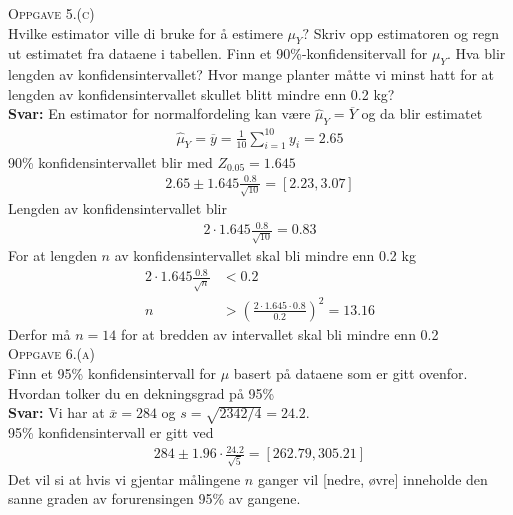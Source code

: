 \documentclass{article}
\begin{document}
\textsc{Oppgave 5.(c)}\\
Hvilke estimator ville di bruke for å estimere $\mu_Y?$ Skriv opp estimatoren og
regn ut estimatet fra dataene i tabellen. Finn et 90\%-konfidensitervall for
$\mu_Y.$ Hva blir lengden av konfidensintervallet? Hvor mange planter måtte vi
minst hatt for at lengden av konfidensintervallet skullet blitt mindre enn 0.2
kg?\\
\textbf{Svar:} En estimator for normalfordeling kan være
$\hat{\mu}_Y=\overline{Y}$ og da blir estimatet
\begin{align*}
  \hat{\mu}_Y=\overline{y}=\frac{1}{10}\sum_{i=1}^{10}y_i=2.65
\end{align*}
90\% konfidensintervallet blir med $Z_{0.05}=1.645$
\begin{align*}
  2.65\pm 1.645 \frac{0.8}{\sqrt{10}}=[2.23, 3.07]
\end{align*}
Lengden av konfidensintervallet blir
\begin{align*}
  2\cdot 1.645 \frac{0.8}{\sqrt{10}}=0.83
\end{align*}
For at lengden $n$ av konfidensintervallet skal bli mindre enn 0.2 kg
\begin{align*}
  2\cdot 1.645\frac{0.8}{\sqrt{n}} &< 0.2\\
                                 n &> \left( \frac{2\cdot 1.645\cdot 0.8}{0.2} \right)^2=13.16
\end{align*}
Derfor må $n=14$ for at bredden av intervallet skal bli mindre enn 0.2\\

\textsc{Oppgave 6.(a)}\\
Finn et 95\% konfidensintervall for $\mu$ basert på dataene som er gitt ovenfor.
Hvordan tolker du en dekningsgrad på 95\%
\\\textbf{Svar:} Vi har at $\overline{x}= 284$ og $s=\sqrt{2342/4}=24.2$.\\
95\% konfidensintervall er gitt ved
\begin{align*}
  284\pm 1.96 \cdot \frac{24.2}{\sqrt{5}}= [262.79, 305.21]
\end{align*}
Det vil si at hvis vi gjentar målingene $n$ ganger vil [nedre, øvre] inneholde
den sanne graden av forurensingen 95\% av gangene.
\end{document}
